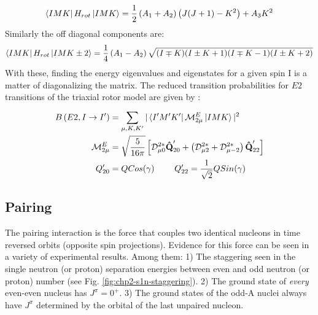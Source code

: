 \begin{equation}
\label{eqn:chp2-triaxial-diagonal-hamil}
\Bra{IMK}H_{rot}\Ket{IMK}=\frac{1}{2}\left(A_1+A_2\right)\left(J(J+1)-K^2\right) + A_3K^2
\end{equation}
Similarly the off diagonal components are:
\begin{equation}
\label{eqn:chp2-triaxial-offdiagonal-hamil}
\Bra{IMK}H_{rot}\Ket{IMK\pm{}2}=\frac{1}{4}\left(A_1-A_2\right)\sqrt{(I\mp{}K)(I\pm{}K+1)(I\mp{}K-1)(I\pm{}K+2)}
\end{equation}
With these, finding the energy eigenvalues and eigenstates for a given spin I is a matter of diagonalizing the matrix. The reduced transition probabilities for $E2$ transitions of the triaxial rotor model are given by \cite{wobblingGeometry}:
\begin{align}
\label{eqn:chp2-triaxial-rotor-reduced-transitions}
B\left(E2,I\rightarrow{}I'\right) &=\sum\limits_{\mu{},K,K'}^{}|\Bra{I'M'K'}\mathcal{M}^E_{2\mu}\Ket{IMK}|^2\\
\mathcal{M}^E_{2\mu} &= \sqrt{\frac{5}{16\pi}}\left[\mathcal{D}^{2*}_{\mu{}0}\boldsymbol{\hat{\textbf{Q}}}'_{20}+\left(\mathcal{D}^{2*}_{\mu{}2}+\mathcal{D}^{2*}_{\mu{}-2}\right)\boldsymbol{\hat{\textbf{Q}}}'_{22}\right] \nonumber\\
Q'_{20} &= Q Cos(\gamma) ~~~~~~~ Q'_{22} = \frac{1}{\sqrt{2}}Q Sin(\gamma) \nonumber
\end{align}

\subsection{Pairing}
\label{ssec:models-pairing}
The pairing interaction is the force that couples two identical nucleons in time reversed orbits (opposite spin projections). Evidence for this force can be seen in a variety of experimental results. Among them: 1) The staggering seen in the single neutron (or proton) separation energies between even and odd neutron (or proton) number (see Fig. \ref{fig:chp2-s1n-staggering}). 2) The ground state of \emph{every} even-even nucleus has $J^{\pi}=0^+$. 3) The ground states of the odd-A nuclei always have $J^{\pi}$ determined by the orbital of the last unpaired nucleon.

